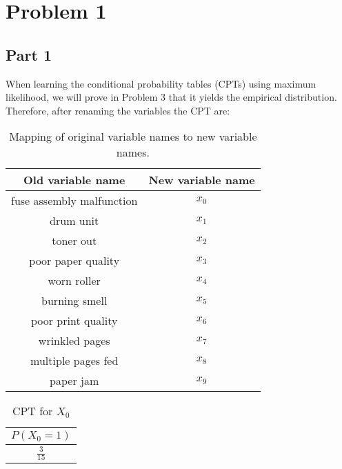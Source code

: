 \documentclass{article}
\begin{document}



\section*{Problem 1}
\renewcommand{\arraystretch}{1.5}

\subsection*{Part 1}

When learning the conditional probability tables (CPTs) using maximum likelihood, we will prove in Problem 3 that it yields the empirical distribution. Therefore, after renaming the variables the CPT are:


\begin{table}[H]
\centering
\begin{tabular}{|c|c|}
\hline
\textbf{Old variable name} & \textbf{New variable name} \\ \hline
fuse assembly malfunction & $x_0$ \\ \hline
drum unit                 & $x_1$ \\ \hline
toner out                 & $x_2$ \\ \hline
poor paper quality        & $x_3$ \\ \hline
worn roller               & $x_4$ \\ \hline
burning smell             & $x_5$ \\ \hline
poor print quality        & $x_6$ \\ \hline
wrinkled pages            & $x_7$ \\ \hline
multiple pages fed        & $x_8$ \\ \hline
paper jam                 & $x_9$ \\ \hline
\end{tabular}
\caption{Mapping of original variable names to new variable names.}
\label{tab:my-table}
\end{table}



\begin{table}[H]
\centering
\begin{tabular}{|c|}
\hline
$P(X_0 = 1)$  \\ \hline
$\frac{3}{15}$ \\ \hline
\end{tabular}
\caption{CPT for $X_0$}
\end{table}
\end{document}
